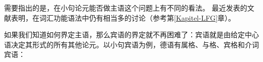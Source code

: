 
需要指出的是，在小句论元能否做主语这个问题上有不同的看法。
最近发表的文献表明，在词汇功能语法中仍有相当多的讨论（参考第\ref{Kapitel-LFG}章）\citep*{DL2000a-u,Berman2003b-u,Berman2007a-u,AMM2005a-u,Forst2006a-u}。  

如果我们知道如何界定主语，那么宾语的界定就不再困难了：宾语就是由给定中心语决定其形式的所有其他论元。以小句宾语为例，德语有属格、与格、宾格和介词宾语：

